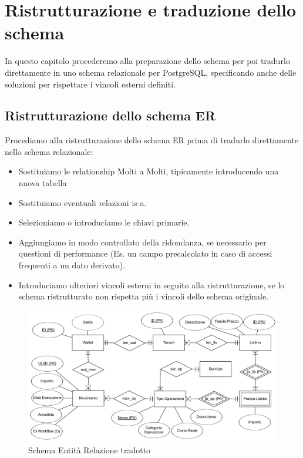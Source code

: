 \chapter{Ristrutturazione e traduzione dello schema}
In questo capitolo procederemo alla preparazione dello schema per poi tradurlo direttamente in uno schema relazionale per PostgreSQL, specificando anche delle soluzioni per
rispettare i vincoli esterni definiti.
\section{Ristrutturazione dello schema ER}
Procediamo alla ristrutturazione dello schema ER prima di tradurlo direttamente nello schema relazionale:
\begin{itemize}
  \item Sostituiamo le relationship Molti a Molti, tipicamente introducendo una nuova tabella
  \item Sostituiamo eventuali relazioni is-a.
  \item Selezioniamo o introduciamo le chiavi primarie.
  \item Aggiungiamo in modo controllato della ridondanza, se necessario per questioni di performance (Es. un campo precalcolato in caso di accessi frequenti a un dato derivato).
  \item Introduciamo ulteriori vincoli esterni in seguito alla ristrutturazione, se lo schema ristrutturato non rispetta pi\`u i vincoli dello schema originale.
\end{itemize}
\begin{figure}[H]
  \centering
  \includegraphics[width=13cm]{images/db-diagrams/er-diagram-ristrutturato.png}
  \caption{Schema Entit\`a Relazione tradotto}
\end{figure}

